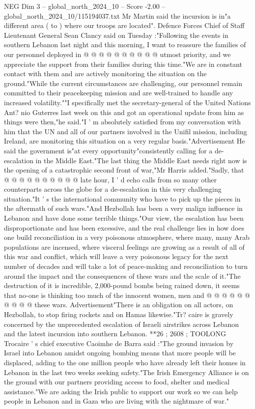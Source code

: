 \begin{textsample}{NEG Dim 3 – global\_north\_2024\_10 – Score -2.00 – global\_north\_2024\_10/115194037.txt}
Mr Martin said the incursion is in"a different area ( to ) where our troops are located".
Defence Forces Chief of Staff Lieutenant General Sean Clancy said on Tuesday :"Following the events in southern Lebanon last night and this morning, I want to reassure the families of our personnel deployed in @ @ @ @ @ @ @ @ @ @ utmost priority, and we appreciate the support from their families during this time."We are in constant contact with them and are actively monitoring the situation on the ground."While the current circumstances are challenging, our personnel remain committed to their peacekeeping mission and are well-trained to handle any increased volatility.""I specifically met the secretary-general of the United Nations Ant? nio Guterres last week on this and got an operational update from him as things were then,"he said."I ' m absolutely satisfied from my conversation with him that the UN and all of our partners involved in the Unifil mission, including Ireland, are monitoring this situation on a very regular basis."Advertisement He said the government is"at every opportunity"consistently calling for a de-escalation in the Middle East."The last thing the Middle East needs right now is the opening of a catastrophic second front of war,"Mr Harris added."Sadly, that @ @ @ @ @ @ @ @ @ @ late hour, I ' d echo calls from so many other counterparts across the globe for a de-escalation in this very challenging situation."It ' s the international community who have to pick up the pieces in the aftermath of such wars."And Hezbollah has been a very malign influence in Lebanon and have done some terrible things."Our view, the escalation has been disproportionate and has been excessive, and the real challenge lies in how does one build reconciliation in a very poisonous atmosphere, where many, many Arab populations are incensed, where visceral feelings are growing as a result of all of this war and conflict, which will leave a very poisonous legacy for the next number of decades and will take a lot of peace-making and reconciliation to turn around the impact and the consequences of these wars and the scale of it."The destruction of it is incredible, 2,000-pound bombs being rained down, it seems that no-one is thinking too much of the innocent women, men and @ @ @ @ @ @ @ @ @ @ these wars.
Advertisement"There is an obligation on all actors, on Hezbollah, to stop firing rockets and on Hamas likewise."Tr? caire is gravely concerned by the unprecedented escalation of Israeli airstrikes across Lebanon and the latest incursion into southern Lebanon. **26 ; 2608 ; TOOLONG Trocaire ' s chief executive Caoimhe de Barra said :"The ground invasion by Israel into Lebanon amidst ongoing bombing means that more people will be displaced, adding to the one million people who have already left their homes in Lebanon in the last two weeks seeking safety."The Irish Emergency Alliance is on the ground with our partners providing access to food, shelter and medical assistance."We are asking the Irish public to support our work so we can help people in Lebanon and in Gaza who are living with the nightmare of war."

\end{textsample}
